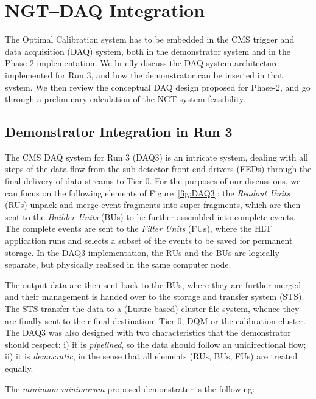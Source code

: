 \section{NGT--DAQ Integration} %


The Optimal Calibration system has to be embedded in the CMS trigger and data acquisition (DAQ) system,
both in the demonstrator system and in the Phase-2 implementation.
We briefly discuss the DAQ system architecture implemented for Run 3, 
and how the demonstrator can be inserted in that system.
We then review the conceptual DAQ design proposed for Phase-2, and 
go through a preliminary calculation of the NGT system feasibility.

\subsection{Demonstrator Integration in Run 3}

The CMS DAQ system for Run 3 (DAQ3) is an intricate system, dealing with all steps of the data flow from the sub-detector front-end drivers (FEDs) through the final delivery of data streams to Tier-0. For the purposes of our discussions, we can focus on the following elements of Figure~\ref{fig:DAQ3}: 
the \emph{Readout Units} (RUs) unpack and merge event fragments into super-fragments, which are then sent to the \emph{Builder Units} (BUs) to be further assembled into complete events. 
The complete events are sent to the \emph{Filter Units} (FUs), where the HLT application runs and selects a subset of the events to be saved for permanent storage. 
In the DAQ3 implementation, the RUs and the BUs are logically separate, but physically realised in the same computer node.

The output data are then sent back to the BUs, where they are further merged and their management is handed over to the storage and transfer system (STS).
The STS  transfer the data to a (Lustre-based) cluster file system, whence they are finally sent to their final destination:
Tier-0,
DQM
or the calibration cluster.
The DAQ3 was also designed with two characteristics that the demonstrator should respect: 
i) it is \emph{pipelined}, so the data should follow an unidirectional flow;
ii) it is \emph{democratic}, in the sense that all elements (RUs, BUs, FUs) are treated equally.

The \textit{minimum minimorum} proposed demonstrater is the following:

